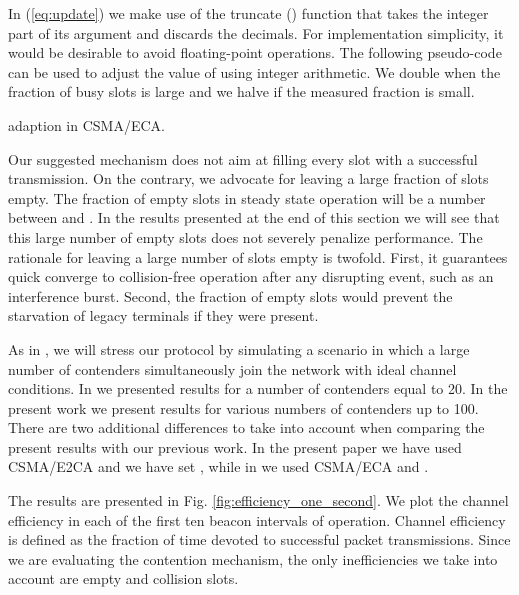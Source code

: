 \documentclass[journal]{IEEEtran}
\begin{document}
In (\ref{eq:update}) we make use of the truncate () function that takes the integer part of its argument and discards the decimals. For implementation simplicity, it would be desirable to avoid floating-point operations. The following pseudo-code can be used to adjust the value of  using integer arithmetic. We double  when the fraction of busy slots is large and we halve  if the measured fraction is small.

\begin{algorithm}
  \;
  \caption{ adaption in CSMA/ECA.}
\label{alg:adaption}
\end{algorithm}

Our suggested mechanism does not aim at filling every slot with a successful transmission. On the contrary, we advocate for leaving a large fraction of slots empty. The fraction of empty slots in steady state operation will be a number between  and . In the results presented at the end of this section we will see that this large number of empty slots does not severely penalize performance. The rationale for leaving a large number of slots empty is twofold. First, it guarantees quick converge to collision-free operation after any disrupting event, such as an interference burst. Second, the fraction of empty slots would prevent the starvation of legacy terminals if they were present. 

As in \cite{barcelo2010dpa}, we will stress our protocol by simulating a scenario in which a large number of contenders simultaneously join the network with ideal channel conditions. In \cite{barcelo2010dpa} we presented results for a number of contenders equal to 20. In the present work we present results for various numbers of contenders up to 100. There are two additional differences to take into account when comparing the present results with our previous work. In the present paper we have used CSMA/E2CA and we have set , while in \cite{barcelo2010dpa} we used CSMA/ECA and .

The results are presented in Fig. \ref{fig:efficiency_one_second}. We plot the channel efficiency in each of the first ten beacon intervals of operation. Channel efficiency is defined as the fraction of time devoted to successful packet transmissions. Since we are evaluating the contention mechanism, the only inefficiencies we take into account are empty and collision slots. 
\end{document}
